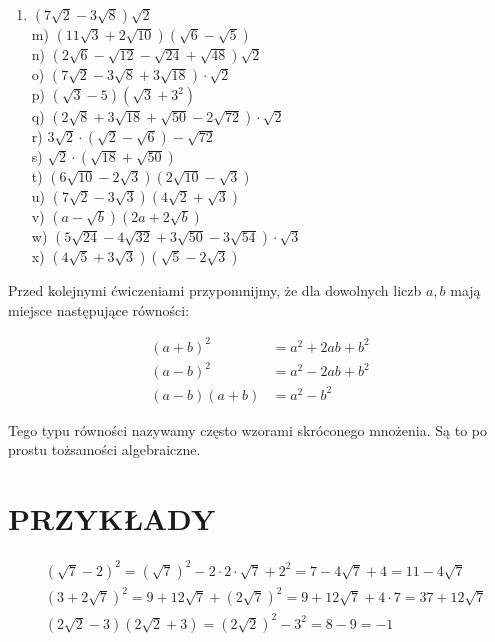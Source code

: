 \documentclass[10pt]{article}
\begin{document}
\begin{enumerate}
  \item \((7 \sqrt{2}-3 \sqrt{8}) \sqrt{2}\)\\
m) \((11 \sqrt{3}+2 \sqrt{10})(\sqrt{6}-\sqrt{5})\)\\
n) \((2 \sqrt{6}-\sqrt{12}-\sqrt{24}+\sqrt{48}) \sqrt{2}\)\\
o) \((7 \sqrt{2}-3 \sqrt{8}+3 \sqrt{18}) \cdot \sqrt{2}\)\\
p) \((\sqrt{3}-5)\left(\sqrt{3}+3^{2}\right)\)\\
q) \((2 \sqrt{8}+3 \sqrt{18}+\sqrt{50}-2 \sqrt{72}) \cdot \sqrt{2}\)\\
r) \(3 \sqrt{2} \cdot(\sqrt{2}-\sqrt{6})-\sqrt{72}\)\\
s) \(\sqrt{2} \cdot(\sqrt{18}+\sqrt{50})\)\\
t) \((6 \sqrt{10}-2 \sqrt{3})(2 \sqrt{10}-\sqrt{3})\)\\
u) \((7 \sqrt{2}-3 \sqrt{3})(4 \sqrt{2}+\sqrt{3})\)\\
v) \((a-\sqrt{b})(2 a+2 \sqrt{b})\)\\
w) \((5 \sqrt{24}-4 \sqrt{32}+3 \sqrt{50}-3 \sqrt{54}) \cdot \sqrt{3}\)\\
x) \((4 \sqrt{5}+3 \sqrt{3})(\sqrt{5}-2 \sqrt{3})\)
\end{enumerate}

Przed kolejnymi ćwiczeniami przypomnijmy, że dla dowolnych liczb \(a, b\) mają miejsce następujące równości:

\[
\begin{aligned}
(a+b)^{2} & =a^{2}+2 a b+b^{2} \\
(a-b)^{2} & =a^{2}-2 a b+b^{2} \\
(a-b)(a+b) & =a^{2}-b^{2}
\end{aligned}
\]

Tego typu równości nazywamy często wzorami skróconego mnożenia. Są to po prostu tożsamości algebraiczne.

\section*{PRZYKŁADY}
\[
\begin{aligned}
& (\sqrt{7}-2)^{2}=(\sqrt{7})^{2}-2 \cdot 2 \cdot \sqrt{7}+2^{2}=7-4 \sqrt{7}+4=11-4 \sqrt{7} \\
& (3+2 \sqrt{7})^{2}=9+12 \sqrt{7}+(2 \sqrt{7})^{2}=9+12 \sqrt{7}+4 \cdot 7=37+12 \sqrt{7} \\
& (2 \sqrt{2}-3)(2 \sqrt{2}+3)=(2 \sqrt{2})^{2}-3^{2}=8-9=-1
\end{aligned}
\]
\end{document}

